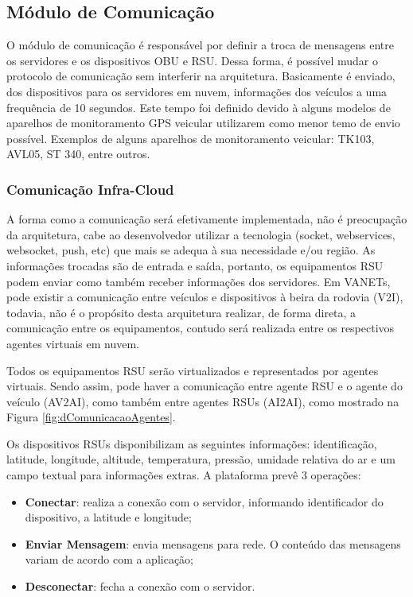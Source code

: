\documentclass[
	12pt,				%
	oneside,			%
	a4paper,			%
	english,			%
	brazil				%
	]{abntex2ppgsi}
\begin{document}
\subsection{Módulo de Comunicação}

O módulo de comunicação é responsável por definir a troca de mensagens entre os servidores e os dispositivos  OBU e RSU. Dessa forma, é possível mudar o protocolo de comunicação sem interferir na arquitetura. Basicamente é enviado, dos dispositivos para os servidores em nuvem, informações dos veículos a uma frequência de 10 segundos. Este tempo foi definido devido à alguns modelos de aparelhos de monitoramento GPS veicular utilizarem como menor temo de envio possível. Exemplos de alguns aparelhos de monitoramento veicular: TK103, AVL05, ST 340, entre outros.

\subsubsection{Comunicação Infra-Cloud}

A forma como a comunicação será efetivamente implementada, não é preocupação da arquitetura, cabe ao desenvolvedor utilizar a tecnologia (socket, webservices, websocket, push, etc) que mais se adequa à sua necessidade e/ou região. As informações trocadas são de entrada e saída, portanto, os equipamentos RSU podem enviar como também receber informações dos servidores. Em VANETs, pode existir a comunicação entre veículos e dispositivos à beira da rodovia (V2I), todavia, não é o propósito desta arquitetura realizar, de forma direta, a comunicação entre os equipamentos, contudo será realizada entre os respectivos agentes virtuais em nuvem. 

Todos os equipamentos RSU serão virtualizados e representados por agentes virtuais. Sendo assim, pode haver a comunicação entre agente RSU e o agente do veículo (AV2AI), como também entre agentes RSUs (AI2AI), como mostrado na Figura \ref{fig:dComunicacaoAgentes}.

Os dispositivos RSUs disponibilizam as seguintes informações: identificação, latitude, longitude, altitude, temperatura, pressão, umidade relativa do ar e um campo textual para informações extras. A plataforma prevê  3 operações:

\begin{itemize}
	\item{\textbf{Conectar}: realiza a conexão com o servidor, informando identificador do dispositivo, a latitude e longitude;}	
	\item{\textbf{Enviar Mensagem}: envia mensagens para rede. O conteúdo das mensagens variam de acordo com a aplicação;}	
	\item{\textbf{Desconectar}: fecha a conexão com o servidor.}	
\end{itemize} 
\end{document}
